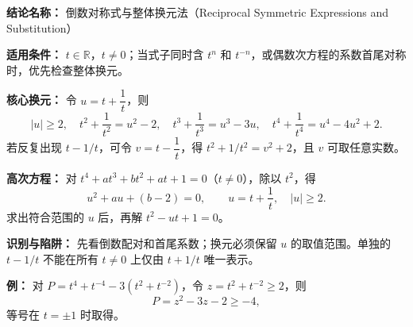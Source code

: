 \textbf{结论名称：} 倒数对称式与整体换元法（Reciprocal Symmetric Expressions and Substitution）

\textbf{适用条件：} $t\in\mathbb R$，$t\ne0$；当式子同时含 $t^n$ 和 $t^{-n}$，或偶数次方程的系数首尾对称时，优先检查整体换元。

\textbf{核心换元：} 令 $u=t+\dfrac1t$，则
\[
\boxed{\left|u\right|\ge2,\quad
 t^2+\frac1{t^2}=u^2-2,\quad
 t^3+\frac1{t^3}=u^3-3u,\quad
 t^4+\frac1{t^4}=u^4-4u^2+2.}
\]
若反复出现 $t-1/t$，可令 $v=t-\dfrac1t$，得 $t^2+1/t^2=v^2+2$，且 $v$ 可取任意实数。

\textbf{高次方程：} 对 $t^4+at^3+bt^2+at+1=0$（$t\ne0$），除以 $t^2$，得
\[
\boxed{u^2+au+(b-2)=0,\qquad u=t+\frac1t,\quad |u|\ge2.}
\]
求出符合范围的 $u$ 后，再解 $t^2-ut+1=0$。

\textbf{识别与陷阱：} 先看倒数配对和首尾系数；换元必须保留 $u$ 的取值范围。单独的 $t-1/t$ 不能在所有 $t\ne0$ 上仅由 $t+1/t$ 唯一表示。

\textbf{例：} 对 $P=t^4+t^{-4}-3(t^2+t^{-2})$，令 $z=t^2+t^{-2}\ge2$，则
\[
P=z^2-3z-2\ge-4,
\]
等号在 $t=\pm1$ 时取得。

